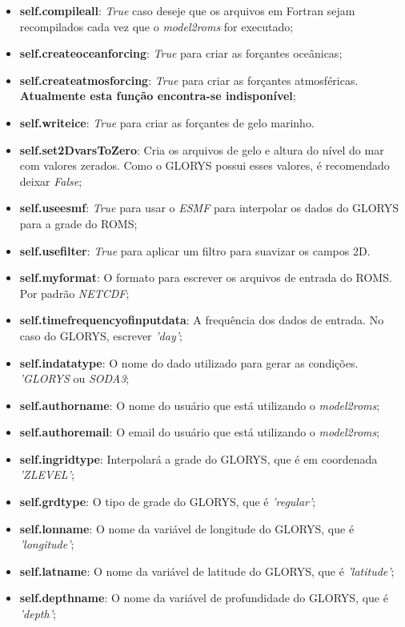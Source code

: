 \begin{itemize}
    \item \textbf{self.compileall}: \textit{True} caso deseje que os arquivos em Fortran sejam recompilados cada vez que o \textit{model2roms} for executado;
    \item \textbf{self.createoceanforcing}: \textit{True} para criar as forçantes oceânicas;
    \item \textbf{self.createatmosforcing}: \textit{True} para criar as forçantes atmosféricas. \textbf{Atualmente esta função encontra-se indisponível};
    \item \textbf{self.writeice}: \textit{True} para criar as forçantes de gelo marinho.
    \item \textbf{self.set2DvarsToZero}: Cria os arquivos de gelo e altura do nível do mar com valores zerados. Como o GLORYS possui esses valores, é recomendado deixar \textit{False};
    \item \textbf{self.useesmf}: \textit{True} para usar o \textit{ESMF} para interpolar os dados do GLORYS para a grade do ROMS;
    \item \textbf{self.usefilter}: \textit{True} para aplicar um filtro para suavizar os campos 2D.
    \item \textbf{self.myformat}: O formato para escrever os arquivos de entrada do ROMS. Por padrão \textit{NETCDF};
    \item \textbf{self.timefrequencyofinputdata}: A frequência dos dados de entrada. No caso do GLORYS, escrever \textit{'day'};
    \item \textbf{self.indatatype}: O nome do dado utilizado para gerar as condições. \textit{'GLORYS} ou \textit{SODA3};
    \item \textbf{self.authorname}: O nome do usuário que está utilizando o \textit{model2roms};
    \item \textbf{self.authoremail}: O email do usuário que está utilizando o \textit{model2roms};
    \item \textbf{self.ingridtype}: Interpolará a grade do GLORYS, que é em coordenada \textit{'ZLEVEL'};
    \item \textbf{self.grdtype}: O tipo de grade do GLORYS, que é \textit{'regular'};
    \item \textbf{self.lonname}: O nome da variável de longitude do GLORYS, que é \textit{'longitude'};
    \item \textbf{self.latname}: O nome da variável de latitude do GLORYS, que é \textit{'latitude'};
    \item \textbf{self.depthname}: O nome da variável de profundidade do GLORYS, que é \textit{'depth'};

\end{itemize}
